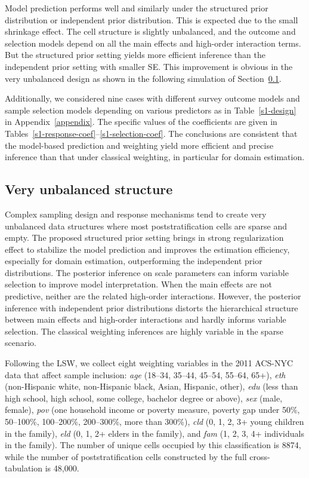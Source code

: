 \documentclass[11pt]{article}
\numberwithin{figure}{section}
\numberwithin{table}{section}
\numberwithin{equation}{section}
\begin{document}
Model prediction performs well and similarly under the structured prior
distribution or independent prior distribution. This is expected due to the
small shrinkage effect. The cell structure is slightly unbalanced, and the
outcome and selection models depend on all the main effects and high-order
interaction terms. But the structured prior setting yields more efficient
inference than the independent prior setting with smaller SE. This improvement
is obvious in the very unbalanced design as shown in the following simulation
of Section~\ref{8var}.

Additionally, we considered nine cases with different survey outcome models and
sample selection models depending on various predictors as in
Table~\ref{s1-design} in Appendix~\ref{appendix}. The specific values of the
coefficients are given in
Tables~\ref{s1-response-coef}--\ref{s1-selection-coef}. The conclusions are
consistent that the model-based prediction and weighting yield more efficient
and precise inference than that under classical weighting, in particular for
domain estimation.

\subsection{Very unbalanced structure} \label{8var}

Complex sampling design and response mechanisms tend to create very unbalanced
data structures where most poststratification cells are sparse and empty. The
proposed structured prior setting brings in strong regularization effect to
stabilize the model prediction and improves the estimation efficiency,
especially for domain estimation, outperforming the independent prior
distributions. The posterior inference on scale parameters can inform variable
selection to improve model interpretation. When the main effects are not
predictive, neither are the related high-order interactions. However, the
posterior inference with independent prior distributions distorts the
hierarchical structure between main effects and high-order interactions and
hardly informs variable selection. The classical weighting inferences are
highly variable in the sparse scenario. 

Following the LSW, we collect eight weighting variables in the 2011 ACS-NYC
data that affect sample inclusion: {\em age} (18--34, 35--44, 45--54, 55--64,
65+), {\em eth} (non-Hispanic white, non-Hispanic black, Asian, Hispanic,
other), {\em edu} (less than high school, high school, some college, bachelor
degree or above), {\em sex} (male, female), {\em pov} (one household income or
poverty measure, poverty gap under 50\%, 50--100\%, 100--200\%, 200--300\%,
more than 300\%), {\em cld} (0, 1, 2, 3+ young children in the family), {\em
eld} (0, 1, 2+ elders in the family), and {\em fam} (1, 2, 3, 4+ individuals in
the family). The number of unique cells occupied by this classification is
8874, while the number of poststratification cells constructed by the full
cross-tabulation is 48,000. 
\end{document}
